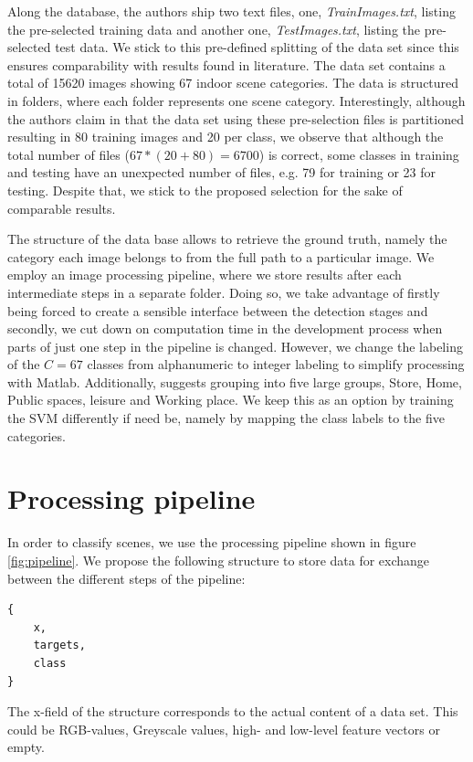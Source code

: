 \documentclass[10pt,twocolumn,letterpaper]{article}
\begin{document}
Along the database, the authors ship two text files, one, \emph{TrainImages.txt}, listing the pre-selected training data and another one, \emph{TestImages.txt}, listing the pre-selected test data. We stick to this pre-defined splitting of the data set since this ensures comparability with results found in literature. The data set contains a total of 15620 images showing 67 indoor scene categories. The data is structured in folders, where each folder represents one scene category. Interestingly, although the authors claim in \cite{indoorScenes} that the data set using these pre-selection files is partitioned resulting in 80 training images and 20 per class, we observe that although the total number of files ($67*(20+80) = 6700$) is correct, some classes in training and testing have an unexpected number of files, e.g. 79 for training or 23 for testing. Despite that, we stick to the proposed selection for the sake of comparable results.

The structure of the data base allows to retrieve the ground truth, namely the category each image belongs to from the full path to a particular image. We employ an image processing pipeline, where we store results after each intermediate steps in a separate folder. Doing so, we take advantage of firstly being forced to create a sensible interface between the detection stages and secondly, we cut down on computation time in the development process when parts of just one step in the pipeline is changed. However, we change the labeling of the $C=67$ classes from alphanumeric to integer labeling to simplify processing with Matlab. Additionally, \cite{indoorScenes} suggests grouping into five large groups, Store, Home, Public spaces, leisure and Working place. We keep this as an option by training the SVM differently if need be, namely by mapping the class labels to the five categories.



\section{Processing pipeline}
In order to classify scenes, we use the processing pipeline shown in figure \ref{fig:pipeline}. We propose the following structure to store data for exchange between the different steps of the pipeline:


\begin{lstlisting}
{
	x,
	targets,
	class
}
\end{lstlisting}

The x-field of the structure corresponds to the actual content of a data set. This could be RGB-values, Greyscale values, high- and low-level feature vectors or empty.
\end{document}
